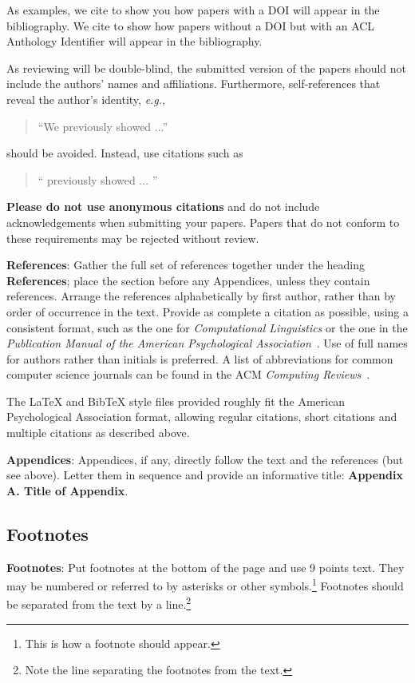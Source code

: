 \documentclass[11pt,a4paper]{article}
\begin{document}
As examples, we cite \cite{P16-1001} to show you how papers with a DOI
will appear in the bibliography.  We cite \cite{C14-1001} to show how
papers without a DOI but with an ACL Anthology Identifier will appear
in the bibliography.  

As reviewing will be double-blind, the submitted version of the papers
should not include the authors' names and affiliations. Furthermore,
self-references that reveal the author's identity, {\em e.g.},
\begin{quote}
``We previously showed \cite{Gusfield:97} ...''  
\end{quote}
should be avoided. Instead, use citations such as 
\begin{quote}
``\citeauthor{Gusfield:97} 
previously showed ... ''
\end{quote}

\textbf{Please do not use anonymous citations} and do not include
acknowledgements when submitting your papers. Papers that do not
conform to these requirements may be rejected without review.

\textbf{References}: Gather the full set of references together under
the heading {\bf References}; place the section before any Appendices,
unless they contain references. Arrange the references alphabetically
by first author, rather than by order of occurrence in the text.
Provide as complete a citation as possible, using a consistent format,
such as the one for {\em Computational Linguistics\/} or the one in the 
{\em Publication Manual of the American 
Psychological Association\/}~\cite{APA:83}.  Use of full names for
authors rather than initials is preferred.  A list of abbreviations
for common computer science journals can be found in the ACM 
{\em Computing Reviews\/}~\cite{ACM:83}.

The \LaTeX{} and Bib\TeX{} style files provided roughly fit the
American Psychological Association format, allowing regular citations, 
short citations and multiple citations as described above.

{\bf Appendices}: Appendices, if any, directly follow the text and the
references (but see above).  Letter them in sequence and provide an
informative title: {\bf Appendix A. Title of Appendix}.

\subsection{Footnotes}

{\bf Footnotes}: Put footnotes at the bottom of the page and use 9
points text. They may be numbered or referred to by asterisks or other
symbols.\footnote{This is how a footnote should appear.} Footnotes
should be separated from the text by a line.\footnote{Note the line
separating the footnotes from the text.}
\end{document}
